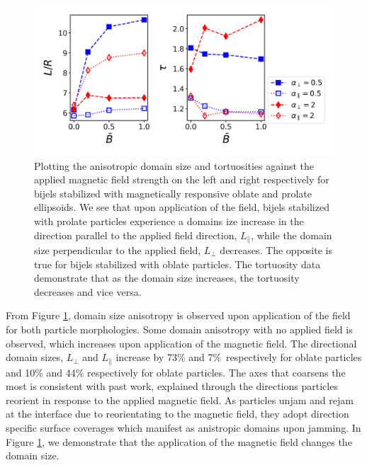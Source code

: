 \begin{figure} 
\centering 
\includegraphics[scale=0.5]{../figures/results/paper2/domain_size_aniso-field_on.png} 
\caption{Plotting the anisotropic domain size and tortuosities against the applied magnetic field strength on the left and right respectively for bijels 
         stabilized with magnetically responsive oblate and prolate ellipsoids. We see that upon application of the field, bijels stabilized with prolate 
         particles experience a domains ize increase in the direction parallel to the applied field direction, $L_{\parallel}$, while the domain size 
         perpendicular to the applied field, $L_{\perp}$ decreases. The opposite is true for bijels stabilized with oblate particles. The tortuosity data 
         demonstrate that as the domain size increases, the tortuosity decreases and vice versa.} 
\label{fig:domain_size_aniso-field_on} 
\end{figure}

From Figure \ref{fig:domain_size_aniso-field_on}, domain size anisotropy is observed upon application of the field for both
particle morphologies. Some domain anisotropy with no applied field is observed, which increases upon application of the magnetic field.
The directional domain sizes, $L_{\perp}$ and $L_{\parallel}$ increase by 73\% and 7\%\ respectively for oblate particles and
10\% and 44\% respectively for oblate particles. The axes that coarsens the most is consistent with past work, explained through the
directions particles reorient in response to the applied magnetic field. As particles unjam and rejam at the interface due to reorientating 
to the magnetic field, they adopt direction specific surface coverages which manifest as anistropic domains upon jamming. In Figure 
\ref{fig:domain_size_aniso-field_on}, we demonstrate that the application of the magnetic field changes the domain size. 

